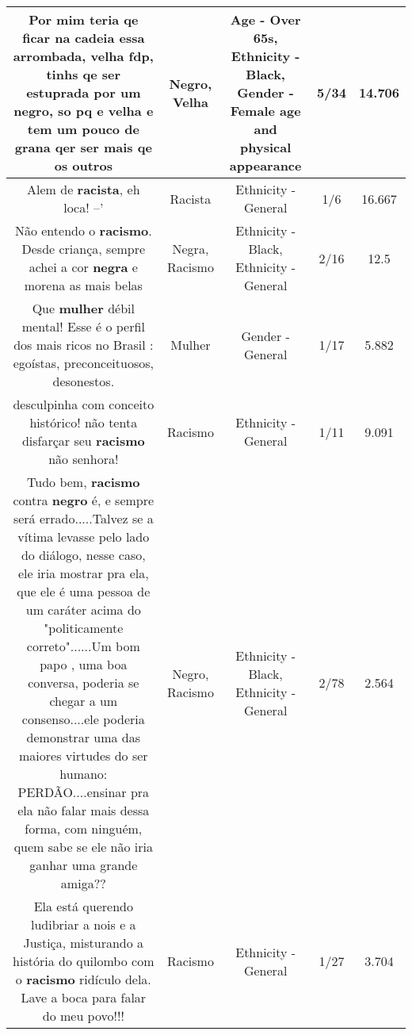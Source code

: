 \documentclass[11pt]{article}
\newlength\mylength
\begin{document}
\begin{center}
\begin{longtable}{|C{.65\mylength}|C{.30\mylength}|C{.12\mylength}|C{.12\mylength}|C{.12\mylength}|}
  \small Por mim teria qe ficar na cadeia essa arrombada, \textbf{v\textbf{elha}} fdp, tinhs qe ser estuprada por um \textbf{negro}, so pq e \textbf{v\textbf{elha}} e tem um pouco de grana qer ser mais qe os outros\normalsize   & Negro, Velha & Age - Over 65s, Ethnicity - Black, Gender - Female age and physical appearance & 5/34 & 14.706 \\  \hline
  \small Alem de \textbf{racista}, eh loca! --'\normalsize   & Racista & Ethnicity - General & 1/6 & 16.667 \\  \hline
  \small Não entendo o \textbf{racismo}. Desde criança, sempre achei a cor \textbf{negra} e morena as mais belas\normalsize   & Negra, Racismo & Ethnicity - Black, Ethnicity - General & 2/16 & 12.5 \\  \hline
  \small Que \textbf{mulher} débil mental! Esse é o perfil dos mais ricos no Brasil : egoístas,  preconceituosos, desonestos.\normalsize   & Mulher & Gender - General & 1/17 & 5.882 \\  \hline
  \small desculpinha com conceito histórico! não tenta disfarçar seu \textbf{racismo} não senhora!\normalsize   & Racismo & Ethnicity - General & 1/11 & 9.091 \\  \hline
  \small Tudo bem, \textbf{racismo} contra \textbf{negro} é, e sempre  será  errado.....Talvez se a vítima levasse pelo lado do diálogo,  nesse caso, ele iria mostrar pra ela, que ele é uma pessoa de um caráter acima do "politicamente  correto"......Um bom papo , uma boa conversa, poderia se chegar a um consenso....ele poderia demonstrar uma das  maiores virtudes do ser humano: PERDÃO....ensinar pra ela não falar mais dessa forma, com ninguém,  quem sabe se ele não iria ganhar uma grande amiga??\normalsize   & Negro, Racismo & Ethnicity - Black, Ethnicity - General & 2/78 & 2.564 \\  \hline
  \small Ela está querendo ludibriar a nois e a Justiça, misturando a história do quilombo com o \textbf{racismo} ridículo dela. Lave a boca para falar do meu povo!!!\normalsize   & Racismo & Ethnicity - General & 1/27 & 3.704 \\  \hline

\end{longtable}
\end{center}
\end{document}
